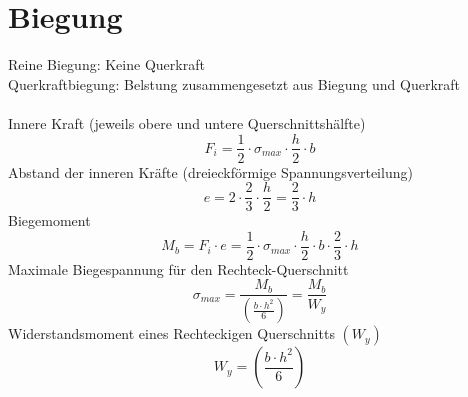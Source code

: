 



\section{Biegung}
Reine Biegung: Keine Querkraft\\
Querkraftbiegung: Belstung zusammengesetzt aus Biegung und Querkraft\\\\
Innere Kraft (jeweils obere und untere Querschnittshälfte)
\[ F_i = \frac{1}{2} \cdot \sigma_{max} \cdot \frac{h}{2} \cdot b \]
Abstand der inneren Kräfte (dreieckförmige Spannungsverteilung)
\[ e = 2 \cdot \frac{2}{3} \cdot \frac{h}{2} = \frac{2}{3} \cdot h \]
Biegemoment
\[ M_b = F_i \cdot e = \frac{1}{2} \cdot \sigma_{max} \cdot \frac{h}{2} \cdot b \cdot \frac{2}{3} \cdot h \]
Maximale Biegespannung für den Rechteck-Querschnitt
\[ \sigma_{max} = \frac{M_b}{\left(\frac{b \cdot h^2}{6}\right)} = \frac{M_b}{W_y} \]
Widerstandsmoment eines Rechteckigen Querschnitts $(W_y)$
\[ W_y = \left(\frac{b \cdot h^2}{6}\right) \]